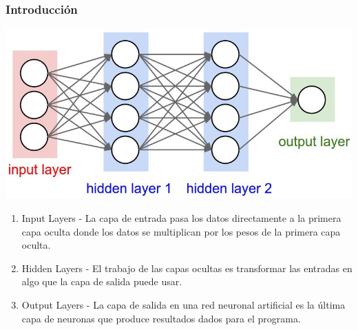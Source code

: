 \begin{frame}
	\frametitle{Introducci\'on}
	\includegraphics[scale=0.25]{topology}

	\begin{enumerate}
		\item Input Layers - La capa de entrada pasa los datos directamente a la primera capa oculta donde los datos se multiplican por los pesos de la primera capa oculta.
		\item Hidden Layers - El trabajo de las capas ocultas es transformar las entradas en algo que la capa de salida puede usar.
		\item Output Layers - La capa de salida en una red neuronal artificial es la \'ultima capa de neuronas que produce resultados dados para el programa.
	\end{enumerate}

\end{frame}

